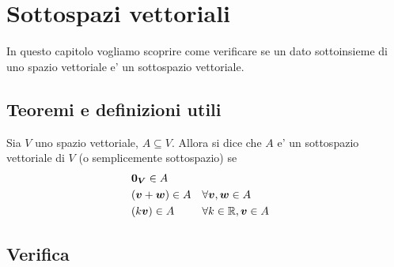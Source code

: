 \chapter{Sottospazi vettoriali}

In questo capitolo vogliamo scoprire come verificare se un dato sottoinsieme di uno spazio vettoriale e' un sottospazio vettoriale.

\section{Teoremi e definizioni utili}

\begin{definition}
    Sia $V$ uno spazio vettoriale, $A \subseteq V$. Allora si dice che $A$ e' un sottospazio vettoriale di $V$ (o semplicemente sottospazio) se
    \begin{align}
        &\bm{0_V} \in A \label{0_in_A}\\
        &(\bm{v} + \bm{w}) \in A    &&\forall \bm{v}, \bm{w} \in A \label{somma_in_A}\\
        &(k\bm{v}) \in A            &&\forall k \in \mathbb{R}, \bm{v} \in A \label{prodotto_in_A}
    \end{align}
\end{definition}

\section{Verifica}

